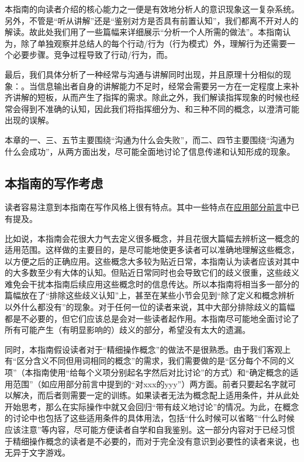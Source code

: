 本指南的向读者介绍的核心能力之一便是有效地分析人的意识现象这一复杂系统。另外，不管是“听从讲解”还是“鉴别对方是否具有前置认知”，我们都离不开对人的解读。故此处我们用了一些篇幅来详细展示“分析一个人所需的做法”。本指南认为，除了单独观察并总结人的每个行动/行为（行为模式）外，理解行为还需要一个必要步骤。竞争过程导致了行动/行为，而。

最后，我们具体分析了一种经常与沟通与讲解同时出现，并且原理十分相似的现象：。当信息输出者自身的讲解能力不足时，经常会需要另一方在一定程度上来补齐讲解的短板，从而产生了指挥的需求。除此之外，我们解读指挥现象的时候也经常会得到不准确的认知，因此我们将指挥细分为、和三种不同的概念，以澄清可能出现的误解。

本章的一、三、五节主要围绕“沟通为什么会失败”，而二、四节主要围绕“沟通为什么会成功”，从两方面出发，尽可能全面地讨论了信息传递和认知形成的现象。

\subsection{本指南的写作考虑}
读者容易注意到本指南在写作风格上很有特点。其中一些特点在\hyperref[sec:应用部分前言]{应用部分前言}中已有提及。

比如说，本指南会花很大力气去定义很多概念，并且花很大篇幅去辨析这一概念的适用范围。这样做的主要目的，是尽可能地使更多读者可以准确地理解这些概念，以方便之后的正确应用。这些概念大多较为贴近日常，本指南认为读者应该对其中的大多数至少有大体的认知。但贴近日常同时也会导致它们的歧义很重，这些歧义难免会干扰本指南后续应用这些概念时的信息传达。所以本指南将相当多一部分的篇幅放在了“排除这些歧义认知”上，甚至在某些小节会见到“除了定义和概念辨析以外什么都没有”的现象。对于任何一位的读者来说，其中大部分排除歧义的篇幅都是不必要的，但它们应该总是会对一些读者起作用。本指南尽可能地全面讨论了所有可能产生（有明显影响的）歧义的部分，希望没有太大的遗漏。

同时，本指南假设读者对于“精细操作概念”的做法不是很熟悉。由于我们客观上有“区分含义不同但用词相同的概念”的需求，我们需要做的是“区分每个不同的义项”（本指南使用“给每个义项分别起名字然后对比讨论”的方式）和“确定概念的适用范围”（如应用部分前言中提到的“对xxx的yyy”）两方面。前者只要起名字就可以解决，而后者则需要一定的训练。如果读者无法为概念配上适用条件，并从此处开始思考，那么在实际操作中就又会回归“带有歧义地讨论”的情况。为此，在概念的讨论中也包括了这些适用条件的具体用法，包括“什么时候可以省略”“什么时候应该注意”等内容，尽可能方便读者自学和自我鉴别。这一部分内容对于已经习惯于精细操作概念的读者是不必要的，而对于完全没有意识到必要性的读者来说，也无异于文字游戏。

